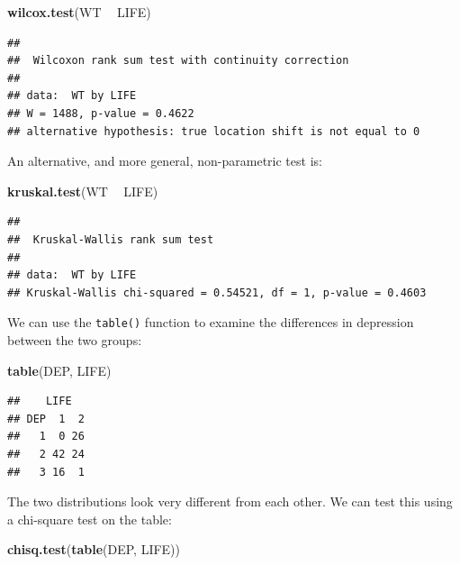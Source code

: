 \documentclass[]{book}
\newenvironment{Shaded}{\begin{snugshade}}{\end{snugshade}}
\newcommand{\KeywordTok}[1]{\textcolor[rgb]{0.13,0.29,0.53}{\textbf{#1}}}
\newcommand{\StringTok}[1]{\textcolor[rgb]{0.31,0.60,0.02}{#1}}
\newcommand{\OperatorTok}[1]{\textcolor[rgb]{0.81,0.36,0.00}{\textbf{#1}}}
\newcommand{\NormalTok}[1]{#1}
\theoremstyle{definition}
\theoremstyle{definition}
\theoremstyle{definition}
\theoremstyle{remark}
\begin{document}
\begin{Shaded}
\begin{Highlighting}[]
\KeywordTok{wilcox.test}\NormalTok{(WT }\OperatorTok{~}\StringTok{ }\NormalTok{LIFE)}
\end{Highlighting}
\end{Shaded}

\begin{verbatim}
## 
##  Wilcoxon rank sum test with continuity correction
## 
## data:  WT by LIFE
## W = 1488, p-value = 0.4622
## alternative hypothesis: true location shift is not equal to 0
\end{verbatim}

An alternative, and more general, non-parametric test is:

\begin{Shaded}
\begin{Highlighting}[]
\KeywordTok{kruskal.test}\NormalTok{(WT }\OperatorTok{~}\StringTok{ }\NormalTok{LIFE)}
\end{Highlighting}
\end{Shaded}

\begin{verbatim}
## 
##  Kruskal-Wallis rank sum test
## 
## data:  WT by LIFE
## Kruskal-Wallis chi-squared = 0.54521, df = 1, p-value = 0.4603
\end{verbatim}

We can use the \texttt{table()} function to examine the differences in
depression between the two groups:

\begin{Shaded}
\begin{Highlighting}[]
\KeywordTok{table}\NormalTok{(DEP, LIFE)}
\end{Highlighting}
\end{Shaded}

\begin{verbatim}
##    LIFE
## DEP  1  2
##   1  0 26
##   2 42 24
##   3 16  1
\end{verbatim}

The two distributions look very different from each other. We can test
this using a chi-square test on the table:

\begin{Shaded}
\begin{Highlighting}[]
\KeywordTok{chisq.test}\NormalTok{(}\KeywordTok{table}\NormalTok{(DEP, LIFE))}
\end{Highlighting}
\end{Shaded}
\end{document}
